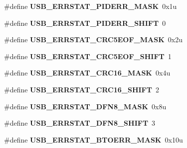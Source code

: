 \begin{DoxyCompactItemize}
\#define {\bfseries U\+S\+B\+\_\+\+E\+R\+R\+S\+T\+A\+T\+\_\+\+P\+I\+D\+E\+R\+R\+\_\+\+M\+A\+SK}~0x1u
\item 
\mbox{\label{group___u_s_b___register___masks_gaf10f584ce9bbe8d7c0d0b8a6a4f61352}} 
\#define {\bfseries U\+S\+B\+\_\+\+E\+R\+R\+S\+T\+A\+T\+\_\+\+P\+I\+D\+E\+R\+R\+\_\+\+S\+H\+I\+FT}~0
\item 
\mbox{\label{group___u_s_b___register___masks_ga400a9d616bd8457e1003d62d62660b5a}} 
\#define {\bfseries U\+S\+B\+\_\+\+E\+R\+R\+S\+T\+A\+T\+\_\+\+C\+R\+C5\+E\+O\+F\+\_\+\+M\+A\+SK}~0x2u
\item 
\mbox{\label{group___u_s_b___register___masks_ga42e986ec54195657a22043422895c708}} 
\#define {\bfseries U\+S\+B\+\_\+\+E\+R\+R\+S\+T\+A\+T\+\_\+\+C\+R\+C5\+E\+O\+F\+\_\+\+S\+H\+I\+FT}~1
\item 
\mbox{\label{group___u_s_b___register___masks_gac9682448ca13abab007c9438e811610c}} 
\#define {\bfseries U\+S\+B\+\_\+\+E\+R\+R\+S\+T\+A\+T\+\_\+\+C\+R\+C16\+\_\+\+M\+A\+SK}~0x4u
\item 
\mbox{\label{group___u_s_b___register___masks_gaf0bd8a085cd33bc98cf89d6ea726be46}} 
\#define {\bfseries U\+S\+B\+\_\+\+E\+R\+R\+S\+T\+A\+T\+\_\+\+C\+R\+C16\+\_\+\+S\+H\+I\+FT}~2
\item 
\mbox{\label{group___u_s_b___register___masks_gaf2aaf7552c127da34a4252936afe561a}} 
\#define {\bfseries U\+S\+B\+\_\+\+E\+R\+R\+S\+T\+A\+T\+\_\+\+D\+F\+N8\+\_\+\+M\+A\+SK}~0x8u
\item 
\mbox{\label{group___u_s_b___register___masks_gae26a3aed245ac0546edc65afaa2c5542}} 
\#define {\bfseries U\+S\+B\+\_\+\+E\+R\+R\+S\+T\+A\+T\+\_\+\+D\+F\+N8\+\_\+\+S\+H\+I\+FT}~3
\item 
\mbox{\label{group___u_s_b___register___masks_ga64f9bd307b556ecbd454571aa2d1b4c8}} 
\#define {\bfseries U\+S\+B\+\_\+\+E\+R\+R\+S\+T\+A\+T\+\_\+\+B\+T\+O\+E\+R\+R\+\_\+\+M\+A\+SK}~0x10u
\item 

\end{DoxyCompactItemize}
